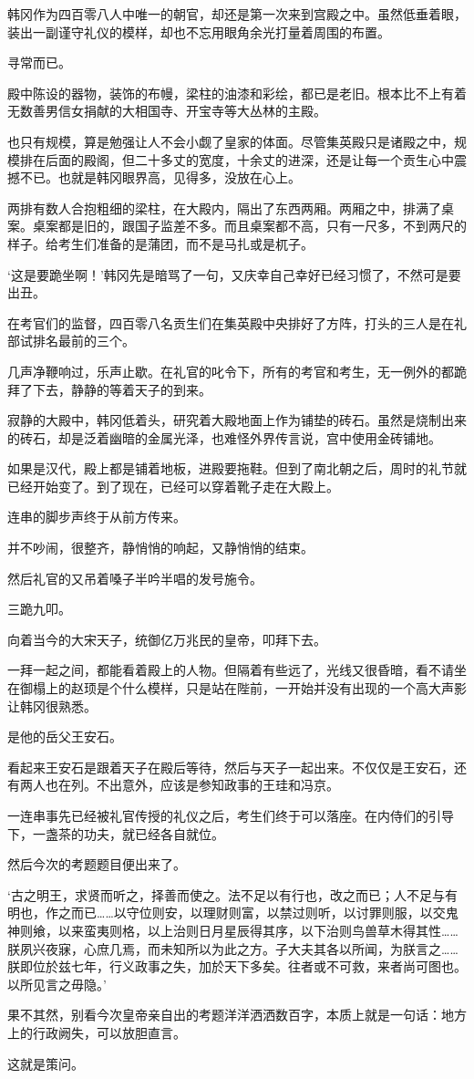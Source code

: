 韩冈作为四百零八人中唯一的朝官，却还是第一次来到宫殿之中。虽然低垂着眼，装出一副谨守礼仪的模样，却也不忘用眼角余光打量着周围的布置。

寻常而已。

殿中陈设的器物，装饰的布幔，梁柱的油漆和彩绘，都已是老旧。根本比不上有着无数善男信女捐献的大相国寺、开宝寺等大丛林的主殿。

也只有规模，算是勉强让人不会小觑了皇家的体面。尽管集英殿只是诸殿之中，规模排在后面的殿阁，但二十多丈的宽度，十余丈的进深，还是让每一个贡生心中震撼不已。也就是韩冈眼界高，见得多，没放在心上。

两排有数人合抱粗细的梁柱，在大殿内，隔出了东西两厢。两厢之中，排满了桌案。桌案都是旧的，跟国子监差不多。而且桌案都不高，只有一尺多，不到两尺的样子。给考生们准备的是蒲团，而不是马扎或是杌子。

‘这是要跪坐啊！’韩冈先是暗骂了一句，又庆幸自己幸好已经习惯了，不然可是要出丑。

在考官们的监督，四百零八名贡生们在集英殿中央排好了方阵，打头的三人是在礼部试排名最前的三个。

几声净鞭响过，乐声止歇。在礼官的叱令下，所有的考官和考生，无一例外的都跪拜了下去，静静的等着天子的到来。

寂静的大殿中，韩冈低着头，研究着大殿地面上作为铺垫的砖石。虽然是烧制出来的砖石，却是泛着幽暗的金属光泽，也难怪外界传言说，宫中使用金砖铺地。

如果是汉代，殿上都是铺着地板，进殿要拖鞋。但到了南北朝之后，周时的礼节就已经开始变了。到了现在，已经可以穿着靴子走在大殿上。

连串的脚步声终于从前方传来。

并不吵闹，很整齐，静悄悄的响起，又静悄悄的结束。

然后礼官的又吊着嗓子半吟半唱的发号施令。

三跪九叩。

向着当今的大宋天子，统御亿万兆民的皇帝，叩拜下去。

一拜一起之间，都能看着殿上的人物。但隔着有些远了，光线又很昏暗，看不请坐在御榻上的赵顼是个什么模样，只是站在陛前，一开始并没有出现的一个高大声影让韩冈很熟悉。

是他的岳父王安石。

看起来王安石是跟着天子在殿后等待，然后与天子一起出来。不仅仅是王安石，还有两人也在列。不出意外，应该是参知政事的王珪和冯京。

一连串事先已经被礼官传授的礼仪之后，考生们终于可以落座。在内侍们的引导下，一盏茶的功夫，就已经各自就位。

然后今次的考题题目便出来了。

‘古之明王，求贤而听之，择善而使之。法不足以有行也，改之而已；人不足与有明也，作之而已……以守位则安，以理财则富，以禁过则听，以讨罪则服，以交鬼神则飨，以来蛮夷则格，以上治则日月星辰得其序，以下治则鸟兽草木得其性……朕夙兴夜寐，心庶几焉，而未知所以为此之方。子大夫其各以所闻，为朕言之……朕即位於兹七年，行义政事之失，加於天下多矣。往者或不可救，来者尚可图也。以所见言之毋隐。’

果不其然，别看今次皇帝亲自出的考题洋洋洒洒数百字，本质上就是一句话：地方上的行政阙失，可以放胆直言。

这就是策问。

